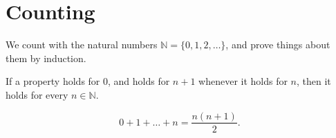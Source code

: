 \chapter{Counting}
\newcommand{\N}{\mathbb{N}}
We count with the natural numbers $\N = \{0, 1, 2, \dots\}$, and prove
things about them by induction.
\begin{theorem}\label{thm:induction}
If a property holds for $0$, and holds for $n+1$ whenever it holds for $n$,
then it holds for every $n \in \N$.
\end{theorem}
\begin{equation}\label{eq:gauss}
  0 + 1 + \dots + n = \frac{n(n+1)}{2}.
\end{equation}
